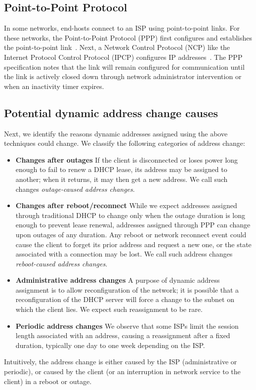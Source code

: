 
\subsection{Point-to-Point Protocol}

In some networks, end-hosts connect to an ISP using
point-to-point links. For these networks, the Point-to-Point Protocol
(PPP) first configures and establishes the point-to-point link~\cite{rfc1661}. Next,
a Network Control Protocol (NCP) like the Internet Protocol Control
Protocol (IPCP) configures IP addresses~\cite{rfc1332}. The PPP specification
notes that the link will remain configured for communication until the
link is actively closed down through network administrator
intervention or when an inactivity timer expires.

\subsection{Potential dynamic address change causes} 

Next, we identify the reasons dynamic addresses assigned using
the above techniques could change. We classify the following categories of address change:

\begin{itemize}
\item{\textbf{Changes after outages}} If the client is
  disconnected or loses power long enough to fail to renew a DHCP lease,
  its address may be assigned to another; when it returns,
  it may then get a new address. We call such changes
  \emph{outage-caused address changes}.

\item{\textbf{Changes after reboot/reconnect}} While we
  expect addresses assigned through traditional DHCP to change only when the
  outage duration is long enough to prevent lease renewal, addresses
  assigned through PPP can change upon outages of any duration. Any reboot or
  network reconnect event could cause the client
  to forget its prior address and request a new one, or the
  state associated with a connection may be lost.
  We call such
  address changes \emph{reboot-caused address changes}. 
  

\item{\textbf{Administrative address changes}} A purpose of
  dynamic address assignment is to allow reconfiguration of
  the network; it is possible that a reconfiguration of the
  DHCP server will force a change to the subnet on which the
  client lies.  We expect such reassignment to be rare.
  
\item{\textbf{Periodic address changes}} We observe that
  some ISPs limit the session length associated with an
  address, causing a reassignment after a fixed duration,
  typically one day to one week depending on the ISP.
\end{itemize}

Intuitively, the address change is
either caused by the ISP (administrative or periodic), or
caused by the client (or an interruption in network service
to the client) in a reboot or outage.

